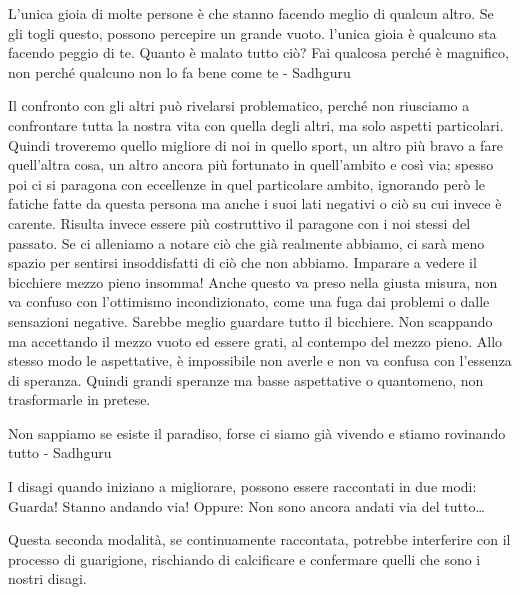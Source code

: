 \documentclass[12pt]{book} %
\begin{document}
L'unica gioia di molte persone è che stanno facendo meglio di qualcun altro. Se gli togli questo, possono percepire un grande vuoto. l'unica gioia è qualcuno sta facendo peggio di te. Quanto è malato tutto ciò? Fai qualcosa perché è magnifico, non perché qualcuno non lo fa bene come te - Sadhguru

Il confronto con gli altri può rivelarsi problematico, perché non riusciamo a confrontare tutta la nostra vita con quella
degli altri, ma solo aspetti particolari. Quindi troveremo quello migliore di noi in quello sport, un altro più bravo a
fare quell'altra cosa, un altro ancora più fortunato in quell'ambito e così
via; spesso poi ci si paragona con eccellenze in quel particolare ambito, ignorando però le fatiche fatte da questa persona ma anche i suoi lati negativi o ciò su cui invece è carente. Risulta invece essere più costruttivo il paragone
con i noi stessi del passato. 
Se ci alleniamo a notare ciò che già realmente abbiamo, ci sarà meno spazio per sentirsi
insoddisfatti di ciò che non abbiamo. Imparare a vedere il bicchiere mezzo pieno insomma! 
Anche questo va preso nella giusta misura, non va confuso con l'ottimismo
incondizionato, come una fuga dai problemi o dalle sensazioni negative. Sarebbe meglio guardare tutto il bicchiere. Non
scappando ma accettando il mezzo vuoto ed essere grati, al contempo del mezzo pieno. Allo stesso modo le aspettative, è
impossibile non averle e non va confusa con l'essenza di speranza. Quindi grandi speranze ma basse
aspettative o quantomeno, non trasformarle in pretese.

Non sappiamo se esiste il paradiso, forse ci siamo già vivendo e stiamo rovinando tutto - Sadhguru

I disagi quando iniziano a migliorare, possono essere raccontati in due modi:
Guarda! Stanno andando via!
Oppure:
Non sono ancora andati via del tutto…

Questa seconda modalità, se continuamente raccontata, potrebbe interferire con il processo di guarigione, rischiando di calcificare e confermare quelli che sono i nostri disagi.
\end{document}
